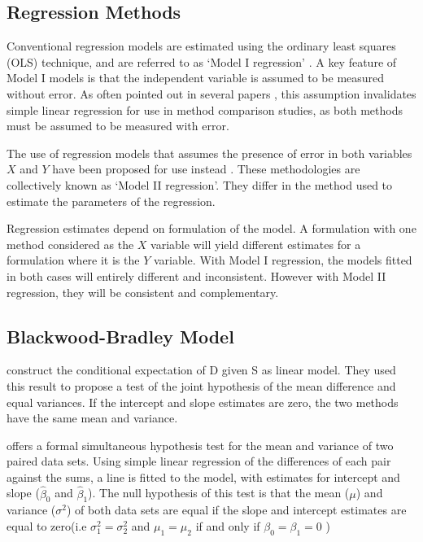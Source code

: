 \documentclass[12pt, a4paper]{report}
\theoremstyle{plain}
\theoremstyle{definition}
\theoremstyle{remark}
\begin{document}
	\subsection{Regression Methods}
	Conventional regression models are estimated using the ordinary
	least squares (OLS) technique, and are referred to as `Model I
	regression' \citep{CornCoch,ludbrook97}. A key feature of Model I
	models is that the independent variable is assumed to be measured
	without error. As often pointed out in several papers
	\citep{BA83,ludbrook97}, this assumption invalidates simple linear
	regression for use in method comparison studies, as both methods
	must be assumed to be measured with error.
	
	The use of regression models that assumes the presence of error in
	both variables $X$ and $Y$ have been proposed for use instead
	\citep{CornCoch,ludbrook97}. These methodologies are collectively
	known as `Model II regression'. They differ in the method used to
	estimate the parameters of the regression.
	
	Regression estimates depend on formulation of the model. A
	formulation with one method considered as the $X$ variable will
	yield different estimates for a formulation where it is the $Y$
	variable. With Model I regression, the models fitted in both cases
	will entirely different and inconsistent. However with Model II
	regression, they will be consistent and complementary.
	
	\subsection{Blackwood-Bradley Model} 
	\citet{BB89} construct the conditional expectation of D given S as linear model.  They used this result to propose a test of the joint hypothesis of the mean difference and equal variances. 
	If the intercept and slope estimates are zero, the two methods have the same mean and variance.
	
	
	\citet{BB89} offers a formal simultaneous hypothesis test for the
	mean and variance of two paired data sets. Using simple linear regression of the differences of each pair against the sums, a
	line is fitted to the model, with estimates for intercept and slope ($\hat{\beta}_{0}$ and $\hat{\beta}_{1}$). The null
	hypothesis of this test is that the mean ($\mu$) and variance
	($\sigma^{2}$) of both data sets are equal if the slope and intercept estimates are equal to zero(i.e $\sigma^{2}_{1} =
	\sigma^{2}_{2}$ and $\mu_{1}=\mu_{2}$ if and only if $\beta_{0}=
	\beta_{1}=0$ )	
	
\end{document}
